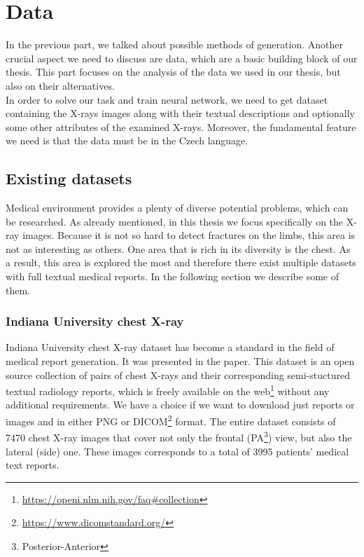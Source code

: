 \section{Data}
In the previous part, we talked about possible methods of generation. Another crucial aspect we need to discuss are data, which are a basic building block of our thesis. This part focuses on the analysis of the data we used in our thesis, but also on their alternatives. \\

In order to solve our task and train neural network, we need to get dataset containing the X-rays images along with their textual descriptions and optionally some other attributes of the examined X-rays. Moreover, the fundamental feature we need is that the data must be in the Czech language.

\subsection{Existing datasets}
\label{sec:datasets}
Medical environment provides a plenty of diverse potential problems, which can be researched. As already mentioned, in this thesis we focus specifically on the X-ray images. Because it is not so hard to detect fractures on the limbs, this area is not as interesting as others. One area that is rich in its diversity is the chest. As a result, this area is explored the most and therefore there exist multiple datasets with full textual medical reports. In the following section we describe some of them.\\

\subsubsection{Indiana University chest X-ray}
\label{sec:IUDataset}
Indiana University chest X-ray dataset has become a standard in the field of medical report generation. It was presented in the \citet{10.1093/jamia/ocv080} paper. This dataset is an open source collection of pairs of chest X-rays and their corresponding semi-stuctured textual radiology reports, which is freely available on the web\footnote[1]{\url{https://openi.nlm.nih.gov/faq\#collection}} without any additional requirements. We have a choice if we want to download just reports or images and in either PNG or DICOM\footnote[2]{\url{https://www.dicomstandard.org/}} format. The entire dataset consists of 7470 chest X-ray images that cover not only the frontal (PA\footnote[3]{Posterior-Anterior}) view, but also the lateral (side) one. These images corresponds to a total of 3995 patients' medical text reports.\\

